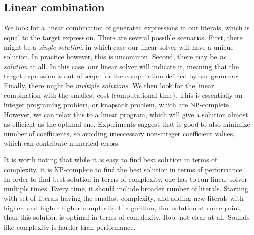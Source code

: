 \subsection{Linear combination}
\label{sec:linear}
We look for a linear combination of generated expressions in our
literals, which is equal to the target expression. There are several
possible scenarios. First, there might be a \emph{single solution}, in
which case our linear solver will have a unique solution. In practice
however, this is uncommon. Second, there may be \emph{no solution} at
all.  In this case, our linear solver will indicate it, meaning that
the target expression is out of scope for the computation defined by
our grammar. Finally, there might be \emph{multiple solutions}. We
then look for the linear combination with the smallest cost
(computational time).  This is essentially an integer programing
problem, or knapsack problem, which are NP-complete. However, we can
relax this to a linear program, which will give a solution almost as
efficient as the optimal one.  Experiments suggest that is good to
also minimize number of coefficients, so avoiding uneccessary
non-integer coefficient values, which can contribute numerical errors.



It is worth noting that while it is easy to find best solution in terms of complexity, it 
is NP-complete to find the best solution in terms of performance. In order to find best solution in terms
of complexity, one has to run linear solver multiple times. Every time, it should include broader number
of literals. Starting with set of literals having the smallest complexity, and adding new literals with
higher, and higher higher complexity. If algorithm, find solution at some point, than this solution is optimal
in terms of complexity. Rob: not clear at all. Sounds like complexity is
harder than performance. 


%

